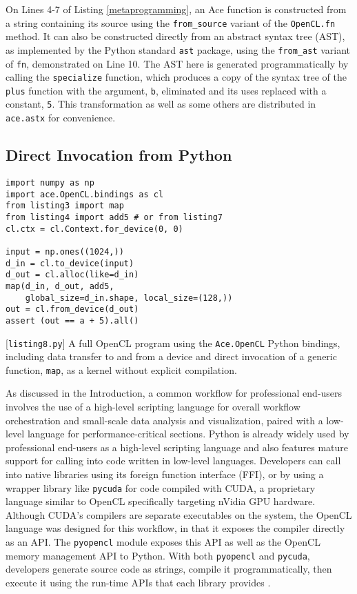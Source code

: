 \documentclass[10pt, conference, compsocconf]{IEEEtran}
\begin{document}
On Lines 4-7 of Listing \ref{metaprogramming}, an Ace function is constructed from a string containing its source using the \verb|from_source| variant of the \verb|OpenCL.fn| method. It can also be constructed directly from an abstract syntax tree (AST), as implemented by the Python standard \verb|ast| package, using the \verb|from_ast| variant of \verb|fn|, demonstrated on Line 10. The AST here is generated programmatically by calling the \verb|specialize| function, which produces a copy of the syntax tree of the \verb|plus| function with the argument, \verb|b|, eliminated and its uses replaced with a constant, \verb|5|. This transformation as well as some others are distributed in \verb|ace.astx| for convenience.
\subsection{Direct Invocation from Python}\label{direct}

\begin{codelisting}
\begin{lstlisting}
import numpy as np
import ace.OpenCL.bindings as cl
from listing3 import map
from listing4 import add5 # or from listing7
cl.ctx = cl.Context.for_device(0, 0)

input = np.ones((1024,))
d_in = cl.to_device(input)
d_out = cl.alloc(like=d_in)
map(d_in, d_out, add5, 
    global_size=d_in.shape, local_size=(128,))
out = cl.from_device(d_out)
assert (out == a + 5).all()
\end{lstlisting}
\caption{[\texttt{listing8.py}] A full OpenCL program using the \texttt{Ace.OpenCL} Python bindings, including data transfer to and from a device and direct invocation of a generic function, \texttt{map}, as a kernel without explicit compilation.}
\label{py}
\end{codelisting}

As discussed in the Introduction, a common workflow for professional end-users involves the use of a high-level scripting language for overall workflow orchestration and small-scale data analysis and visualization, paired with a low-level language for performance-critical sections. Python is already widely used by professional end-users as a high-level scripting language and also features mature support for calling into code written in low-level languages. Developers can call into native libraries using its foreign function interface (FFI),  or by using a wrapper library like \verb|pycuda| for code compiled with CUDA, a proprietary language similar to OpenCL  specifically targeting nVidia GPU hardware. 
Although CUDA's compilers are separate executables on the system, the OpenCL language was designed for this workflow, in that it exposes the compiler directly as an API. The \verb|pyopencl| module exposes this API as well as the OpenCL memory management API to Python. With both \verb|pyopencl| and \verb|pycuda|, developers generate source code as strings, compile it programmatically, then execute it using the run-time APIs that each library provides \cite{pyopencl}.
\end{document}
